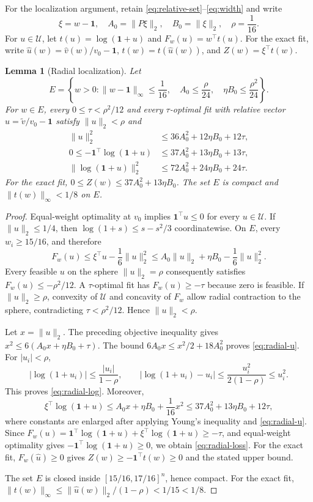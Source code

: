 \documentclass[11pt]{article}
\newtheorem{lemma}[lemma]{Lemma}
\theoremstyle{definition}
\theoremstyle{remark}
\newcommand{\Ucal}{\mathcal U}
\newcommand{\one}{\bm 1}
\newcommand{\norm}[1]{\lVert #1\rVert}
\newcommand{\abs}[1]{\lvert #1\rvert}
\newcommand{\vhat}{\widehat v}
\newcommand{\vtil}{\widetilde v}
\begin{document}
For the localization argument, retain \eqref{eq:relative-set}--\eqref{eq:width}
and write
\[
 \xi=w-\one,\quad A_0=\norm{P\xi}_2,\quad B_0=\norm{\xi}_2,
 \quad \rho=\frac1{16}.
\]
For $u\in\Ucal$, let $t(u)=\log(\one+u)$ and
$F_w(u)=w^\top t(u)$.  For the exact fit, write
$\widehat u(w)=\vhat(w)/v_0-\one$, $t(w)=t(\widehat u(w))$, and
$Z(w)=\xi^\top t(w)$.

\begin{lemma}[Radial localization]
\label{lem:radial}
Let
\begin{equation}\label{eq:localization-event}
 E=\left\{w>0:
\norm{w-\one}_\infty\le\frac1{16},\quad
 A_0\le\frac{\rho}{24},\quad \eta B_0\le\frac{\rho^2}{24}\right\}.
\end{equation}
For $w\in E$, every $0\le\tau<\rho^2/12$ and every $\tau$-optimal fit with
relative vector $u=\vtil/v_0-\one$ satisfy $\norm{u}_2<\rho$ and
\begin{align}
 \norm{u}_2^2&\le36A_0^2+12\eta B_0+12\tau,\label{eq:radial-u}\\
 0\le-\one^\top\log(\one+u)
 &\le37A_0^2+13\eta B_0+13\tau,\label{eq:radial-loss}\\
 \norm{\log(\one+u)}_2^2
 &\le72A_0^2+24\eta B_0+24\tau.\label{eq:radial-log}
\end{align}
For the exact fit, $0\le Z(w)\le37A_0^2+13\eta B_0$.  The set $E$ is
compact and $\norm{t(w)}_\infty<1/8$ on $E$.
\end{lemma}

\begin{proof}
Equal-weight optimality at $v_0$ implies
$\one^\top u\le0$ for every $u\in\Ucal$.  If $\norm{u}_2\le1/4$, then
$\log(1+s)\le s-s^2/3$ coordinatewise.  On $E$, every $w_i\ge15/16$, and
therefore
\[
 F_w(u)\le \xi^\top u-\frac16\norm{u}_2^2
 \le A_0\norm{u}_2+\eta B_0-\frac16\norm{u}_2^2.
\]
Every feasible $u$ on the sphere $\norm{u}_2=\rho$ consequently satisfies
$F_w(u)\le-\rho^2/12$.  A $\tau$-optimal fit has
$F_w(u)\ge-\tau$ because zero is feasible.  If $\norm{u}_2\ge\rho$, convexity
of $\Ucal$ and concavity of $F_w$ allow radial contraction to the sphere,
contradicting $\tau<\rho^2/12$.  Hence $\norm{u}_2<\rho$.

Let $x=\norm{u}_2$.  The preceding objective inequality gives
$x^2\le6(A_0x+\eta B_0+\tau)$.  The bound
$6A_0x\le x^2/2+18A_0^2$ proves \eqref{eq:radial-u}.  For
$\abs{u_i}<\rho$,
\[
 \abs{\log(1+u_i)}\le\frac{\abs{u_i}}{1-\rho},
 \qquad
 \abs{\log(1+u_i)-u_i}\le\frac{u_i^2}{2(1-\rho)}\le u_i^2.
\]
This proves \eqref{eq:radial-log}.  Moreover,
\[
 \xi^\top\log(\one+u)
 \le A_0x+\eta B_0+\frac1{16}x^2
 \le37A_0^2+13\eta B_0+12\tau,
\]
where constants are enlarged after applying Young's inequality and
\eqref{eq:radial-u}.  Since
$F_w(u)=\one^\top\log(\one+u)+\xi^\top\log(\one+u)\ge-\tau$, and equal-weight
optimality gives $-\one^\top\log(\one+u)\ge0$, we obtain
\eqref{eq:radial-loss}.  For the exact fit, $F_w(\widehat u)\ge0$ gives
$Z(w)\ge-\one^\top t(w)\ge0$ and the stated upper bound.

The set $E$ is closed inside $[15/16,17/16]^n$, hence compact.  For the exact
fit, $\norm{t(w)}_\infty\le\norm{\widehat u(w)}_2/(1-\rho)<1/15<1/8$.
\end{proof}
\end{document}
